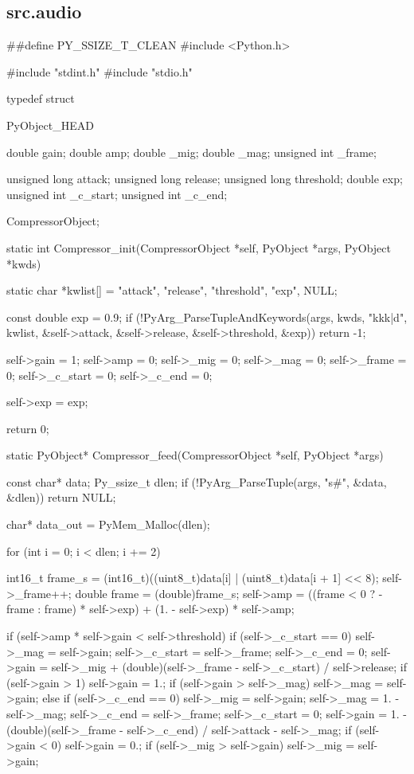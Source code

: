 \subsection{src.audio}
\begin{pythoncode}
\##define PY\_SSIZE\_T\_CLEAN
#include <Python.h>

#include "stdint.h"
#include "stdio.h"

typedef struct {
    PyObject_HEAD

    double gain;
    double amp;
    double _mig;
    double _mag;
    unsigned int _frame;

    unsigned long attack;
    unsigned long release;
    unsigned long threshold;
    double exp;
    unsigned int _c_start;
    unsigned int _c_end;
} CompressorObject;

static int Compressor_init(CompressorObject *self, PyObject *args, PyObject *kwds) {
    static char *kwlist[] = {"attack", "release", "threshold", "exp", NULL};

    const double exp = 0.9;
    if (!PyArg_ParseTupleAndKeywords(args, kwds, "kkk|d", kwlist,
                                     &self->attack, &self->release,
                                     &self->threshold, &exp))
        return -1;

    self->gain = 1;
    self->amp = 0;
    self->_mig = 0;
    self->_mag = 0;
    self->_frame = 0;
    self->_c_start = 0;
    self->_c_end = 0;

    self->exp = exp;

    return 0;
}

static PyObject* Compressor_feed(CompressorObject *self, PyObject *args) {
    const char* data;
    Py_ssize_t dlen;
    if (!PyArg_ParseTuple(args, "s#", &data, &dlen))
        return NULL;

    char* data_out = PyMem_Malloc(dlen);

    for (int i = 0; i < dlen; i += 2) {
        int16_t frame_s = (int16_t)((uint8_t)data[i] | (uint8_t)data[i + 1] << 8);
        self->_frame++;
        double frame = (double)frame_s;
        self->amp = ((frame < 0 ? -frame : frame) * self->exp) + (1. - self->exp) * self->amp;

        if (self->amp * self->gain < self->threshold) {
            if (self->_c_start == 0) {
                self->_mag = self->gain;
                self->_c_start = self->_frame;
                self->_c_end = 0;
            }
            self->gain = self->_mig + (double)(self->_frame - self->_c_start) / self->release;
            if (self->gain > 1)
                self->gain = 1.;
            if (self->gain > self->_mag)
                self->_mag = self->gain;
        } else {
            if (self->_c_end == 0) {
                self->_mig = self->gain;
                self->_mag = 1. - self->_mag;
                self->_c_end = self->_frame;
                self->_c_start = 0;
            }
            self->gain = 1. - (double)(self->_frame - self->_c_end) / self->attack - self->_mag;
            if (self->gain < 0)
                self->gain = 0.;
            if (self->_mig > self->gain)
                self->_mig = self->gain;
        }

}}
\end{pythoncode}
